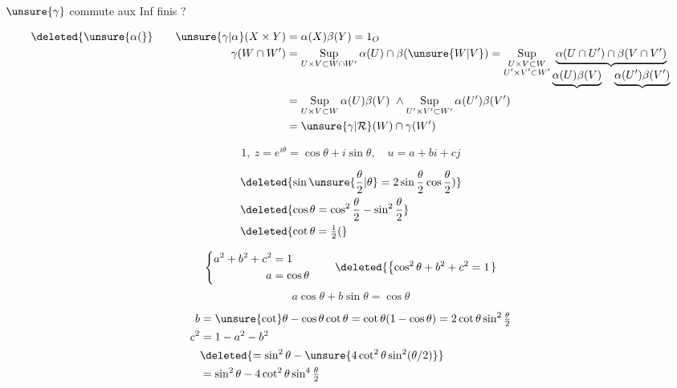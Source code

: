 $\unsure{\gamma}$ commute aux Inf finis ?

\[
\begin{aligned}
\deleted{\unsure{\alpha(}}\qquad \unsure{\gamma|\alpha}(X\times Y)&=\alpha(X)\beta(Y)=1_O\\
\gamma(W\cap W')&=\operatorname*{Sup}_{U\times V\subset W\cap W'}\alpha(U)\cap\beta(\unsure{W|V})
=\operatorname*{Sup}_{\substack{U\times V\subset W\\ U'\times V'\subset W'}}
 \underbrace{\alpha(U\cap U')\cap\beta(V\cap V')}_{\underbrace{\alpha(U)\beta(V)}\quad\underbrace{\alpha(U')\beta(V')}}\\
&=\operatorname*{Sup}_{U\times V\subset W}\alpha(U)\beta(V)\ \wedge\operatorname*{Sup}_{U'\times V'\subset W'}\alpha(U')\beta(V')\\
&=\unsure{\gamma|\mathcal R}(W)\cap\gamma(W')
\end{aligned}
\]


\[
1,\ z=e^{i\theta}=\cos\theta+i\sin\theta,\quad u=a+bi+cj
\]

\[
\begin{aligned}
&\deleted{\sin\unsure{\frac{\theta}{2}|\theta}=2\sin\frac{\theta}{2}\cos\frac{\theta}{2})}\\
&\deleted{\cos\theta=\cos^2\frac{\theta}{2}-\sin^2\frac{\theta}{2}}\\
&\deleted{\cot\theta=\tfrac12(}
\end{aligned}
\]

\[
\left\{\begin{aligned}a^2+b^2+c^2&=1\\a&=\cos\theta\end{aligned}\right.
\qquad
\deleted{\left\{\cos^2\theta+b^2+c^2=1\right.}
\]
\[
 a\cos\theta+b\sin\theta=\cos\theta
\]

\[
\begin{aligned}
b&=\unsure{\cot}\theta-\cos\theta\cot\theta=\cot\theta(1-\cos\theta)=2\cot\theta\sin^2\tfrac\theta2\\
c^2&=1-a^2-b^2\\
&\deleted{=\sin^2\theta-\unsure{4\cot^2\theta\sin^2(\theta/2)}}\\
&=\sin^2\theta-4\cot^2\theta\sin^4\tfrac\theta2
\end{aligned}
\]

